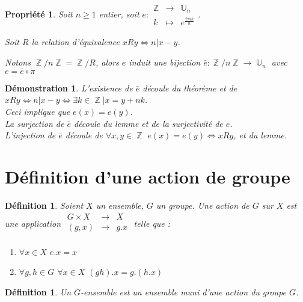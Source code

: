 \documentclass[a4paper, oneside]{report}
\theoremstyle{break}
\newtheorem{defi}[thm]{Définition}
\newtheorem{propr}[thm]{Propriété}
\newtheorem*{demo}{Démonstration}
\newcommand{\x}{\times}
\DeclareMathOperator{\Z}{\mathbb{Z}}
\DeclareMathOperator{\U}{\mathbb{U}}
\begin{document}
\begin{propr}
	Soit $n\geq 1$ entier, soit $e:\begin{array}{lll}
	\Z &\rightarrow &\U_n\\
	k&\mapsto&e^{\frac{2\pi i k}{n}}
	\end{array}$.
	
	Soit $R$ la relation d'équivalence $xRy\Leftrightarrow n|x-y$.
	
	Notons $\Z/n\Z=\Z/R$, alors $e$ induit une bijection $\bar{e}:\Z/n\Z \rightarrow \U_n$ avec $e=\bar{e}\circ \pi$
\end{propr}

\begin{demo}
	L'existence de $\bar{e}$ découle du théorème et de $xRy \Leftrightarrow n|x-y \Leftrightarrow \exists k\in \Z | x=y+nk$.\\
	Ceci implique que $e(x)=e(y)$.\\
	La surjection de $\bar{e}$ découle du lemme et de la surjectivité de $e$.\\
	L'injection de $\bar{e}$ découle de $\forall x,y\in \Z$ $e(x)=e(y)\Leftrightarrow xRy$, et du lemme.
\end{demo}

\section{Définition d'une action de groupe}

\begin{defi} 
	Soient $X$ un ensemble, $G$ un groupe. Une action de $G$ sur $X$ est une application $\begin{array}{lll}
	G\x X &\rightarrow & X\\
	(g,x)&\rightarrow & g.x\\
	\end{array}$ telle que :
	\begin{enumerate}
	\item $\forall x\in X$ $e.x=x$
	\item $\forall g,h\in G$ $\forall x\in X$ $(gh).x=g.(h.x)$
	\end{enumerate}
\end{defi}

\begin{defi}
	Un $G$-ensemble est un ensemble muni d'une action du groupe $G$.	
\end{defi}
\end{document}

